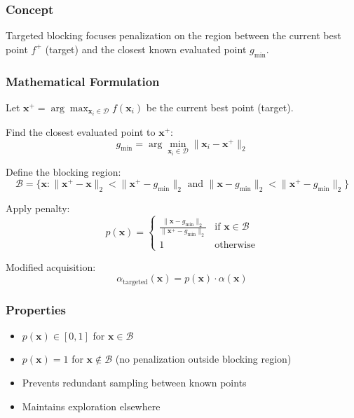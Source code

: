 \documentclass[11pt,a4paper]{article}
\begin{document}
\subsubsection{Concept}

Targeted blocking focuses penalization on the region between the current best point $f^+$ (target) and the closest known evaluated point $g_{\min}$.

\subsubsection{Mathematical Formulation}

Let $\mathbf{x}^+ = \arg\max_{\mathbf{x}_i \in \mathcal{D}} f(\mathbf{x}_i)$ be the current best point (target).

Find the closest evaluated point to $\mathbf{x}^+$:
\begin{equation}
    g_{\min} = \arg\min_{\mathbf{x}_i \in \mathcal{D}} \|\mathbf{x}_i - \mathbf{x}^+\|_2
\end{equation}

Define the blocking region:
\begin{equation}
    \mathcal{B} = \{\mathbf{x} : \|\mathbf{x}^+ - \mathbf{x}\|_2 < \|\mathbf{x}^+ - g_{\min}\|_2 \text{ and } \|\mathbf{x} - g_{\min}\|_2 < \|\mathbf{x}^+ - g_{\min}\|_2\}
\end{equation}

Apply penalty:
\begin{equation}
    p(\mathbf{x}) = 
    \begin{cases}
        \frac{\|\mathbf{x} - g_{\min}\|_2}{\|\mathbf{x}^+ - g_{\min}\|_2} & \text{if } \mathbf{x} \in \mathcal{B} \\
        1 & \text{otherwise}
    \end{cases}
\end{equation}

Modified acquisition:
\begin{equation}
    \alpha_{\text{targeted}}(\mathbf{x}) = p(\mathbf{x}) \cdot \alpha(\mathbf{x})
\end{equation}

\subsubsection{Properties}

\begin{itemize}
    \item $p(\mathbf{x}) \in [0, 1]$ for $\mathbf{x} \in \mathcal{B}$
    \item $p(\mathbf{x}) = 1$ for $\mathbf{x} \notin \mathcal{B}$ (no penalization outside blocking region)
    \item Prevents redundant sampling between known points
    \item Maintains exploration elsewhere
\end{itemize}
\end{document}
